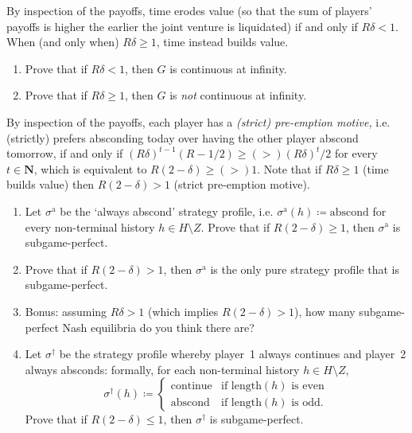 \begin{exercise}
\begin{enumerate}[label=(\alph*)]
	\end{enumerate}

	By inspection of the payoffs, time erodes value (so that the sum of players' payoffs is higher the earlier the joint venture is liquidated) if and only if $R\delta<1$. When (and only when) $R\delta \geq 1$, time instead builds value.

	\begin{enumerate}[label=(\alph*),resume]

		\item Prove that if $R\delta<1$, then $G$ is continuous at infinity.

		\item Prove that if $R\delta \geq 1$, then $G$ is \emph{not} continuous at infinity.

	\end{enumerate}

	By inspection of the payoffs, each player has a \emph{(strict) pre-emption motive,} i.e. (strictly) prefers absconding today over having the other player abscond tomorrow, if and only if $(R \delta)^{t-1} ( R - 1/2 ) \geq \mathrel{(>)} (R\delta)^t/2$ for every $t \in \mathbf{N}$, which is equivalent to $R(2-\delta) \geq \mathrel{(>)} 1$. Note that if $R\delta \geq 1$ (time builds value) then $R(2-\delta)>1$ (strict pre-emption motive).

	\begin{enumerate}[label=(\alph*),resume]

		\item Let $\sigma^\text{a}$ be the `always abscond' strategy profile, i.e. $\sigma^\text{a}(h) \coloneqq \text{abscond}$ for every non-terminal history $h \in H \setminus Z$. Prove that if $R(2-\delta) \geq 1$, then $\sigma^\text{a}$ is subgame-perfect.

		\item Prove that if $R(2-\delta) > 1$, then $\sigma^\text{a}$ is the only pure strategy profile that is subgame-perfect.

		\item Bonus: assuming $R\delta > 1$ (which implies $R(2-\delta) > 1$), how many subgame-perfect Nash equilibria do you think there are?

		\item Let $\sigma^\dag$ be the strategy profile whereby player~1 always continues and player~2 always absconds: formally, for each non-terminal history $h \in H \setminus Z$,
		\begin{equation*}
			\sigma^\dag(h) \coloneqq
			\begin{cases}
				\text{continue} & \text{if $\text{length}(h)$ is even} \\
				\text{abscond} & \text{if $\text{length}(h)$ is odd.} 
			\end{cases}
		\end{equation*}
		Prove that if $R(2-\delta) \leq 1$, then $\sigma^\dag$ is subgame-perfect.

	\end{enumerate}
\end{exercise}
